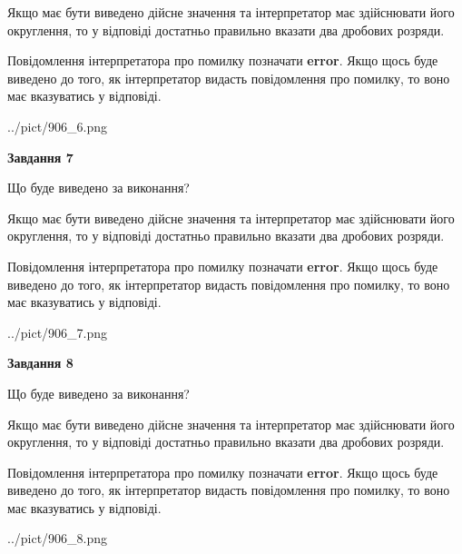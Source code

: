 \documentclass[12pt, ukrainian]{article}
\begin{document}
{\begin {Large}
Якщо має бути виведено дійсне значення та інтерпретатор має здійснювати його округлення, 
то у відповіді достатньо правильно вказати два дробових розряди.

Повідомлення інтерпретатора про помилку позначати \textbf{error}.
Якщо щось буде виведено до того, як інтерпретатор видасть повідомлення про помилку, 
то воно має вказуватись у відповіді. \par

\begin{center}
	{../pict/906_6.png}
\end{center}
\newpage

{\begin {center}\textbf{Завдання 7}\end {center}}\par
Що буде виведено за виконання? \par

Якщо має бути виведено дійсне значення та інтерпретатор має здійснювати його округлення, 
то у відповіді достатньо правильно вказати два дробових розряди.

Повідомлення інтерпретатора про помилку позначати \textbf{error}.
Якщо щось буде виведено до того, як інтерпретатор видасть повідомлення про помилку, 
то воно має вказуватись у відповіді. \par

\begin{center}
	{../pict/906_7.png}
\end{center}
\newpage

{\begin {center}\textbf{Завдання 8}\end {center}}\par
Що буде виведено за виконання? \par

Якщо має бути виведено дійсне значення та інтерпретатор має здійснювати його округлення, 
то у відповіді достатньо правильно вказати два дробових розряди.

Повідомлення інтерпретатора про помилку позначати \textbf{error}.
Якщо щось буде виведено до того, як інтерпретатор видасть повідомлення про помилку, 
то воно має вказуватись у відповіді. \par

\begin{center}
	{../pict/906_8.png}
\end{center}
\newpage


\end{Large}}
\end{document}
